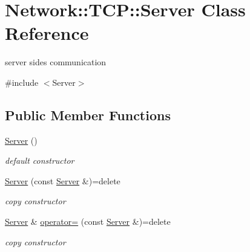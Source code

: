 \hypertarget{class_network_1_1_t_c_p_1_1_server}{}\section{Network\+:\+:T\+CP\+:\+:Server Class Reference}
\label{class_network_1_1_t_c_p_1_1_server}


server side\textquotesingle{}s communication  




{\ttfamily \#include $<$Server$>$}

\subsection*{Public Member Functions}
\begin{DoxyCompactItemize}
\item 
\mbox{\label{class_network_1_1_t_c_p_1_1_server_a7f8a321ebc3a99959eef876e652efcfe}} 
\hyperlink{class_network_1_1_t_c_p_1_1_server_a7f8a321ebc3a99959eef876e652efcfe}{Server} ()
\begin{DoxyCompactList}\small\item\em default constructor \end{DoxyCompactList}\item 
\mbox{\label{class_network_1_1_t_c_p_1_1_server_a1f739954830843ba193781f846736209}} 
\hyperlink{class_network_1_1_t_c_p_1_1_server_a1f739954830843ba193781f846736209}{Server} (const \hyperlink{class_network_1_1_t_c_p_1_1_server}{Server} \&)=delete
\begin{DoxyCompactList}\small\item\em copy constructor \end{DoxyCompactList}\item 
\mbox{\label{class_network_1_1_t_c_p_1_1_server_a06aea839eb36a646a633c43a16346653}} 
\hyperlink{class_network_1_1_t_c_p_1_1_server}{Server} \& \hyperlink{class_network_1_1_t_c_p_1_1_server_a06aea839eb36a646a633c43a16346653}{operator=} (const \hyperlink{class_network_1_1_t_c_p_1_1_server}{Server} \&)=delete
\begin{DoxyCompactList}\small\item\em copy constructor \end{DoxyCompactList}\item 

\end{DoxyCompactItemize}
